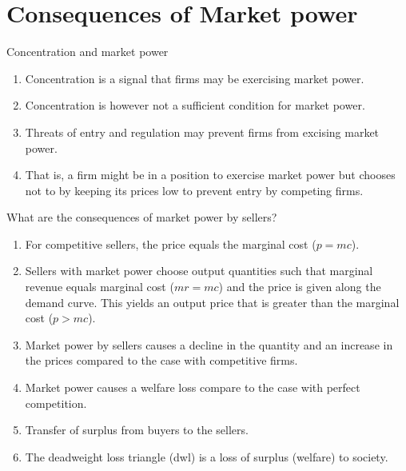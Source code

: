 \documentclass[table,xcolor=pdftex,dvipsnames]{beamer}\usepackage[]{graphicx}\usepackage[]{color}
\begin{document}

\section{Consequences of Market power}

\begin{frame}{Concentration and market power}
\begin{enumerate}[label=\textbullet]
  \item Concentration is a signal that firms may be exercising market power.
  \item Concentration is however not a sufficient condition for market power.
  \item Threats of entry and regulation may prevent firms from excising market power.
  \item That is, a firm might be in a position to exercise market power but chooses not to by keeping its prices low to prevent entry by competing firms.
\end{enumerate}
\end{frame}


\begin{frame}{What are the consequences of market power by sellers?}
\begin{enumerate}[label=\textbullet]
  \item For competitive sellers, the price equals the marginal cost ($p=mc$).
  \item Sellers with market power choose output quantities such that marginal revenue equals marginal cost ($mr=mc$) and the price is given along the demand curve. This yields an output price that is greater than the marginal cost ($p>mc$).
  \item Market power by sellers causes a decline in the quantity and an increase in the prices compared to the case with competitive firms.
  \item Market power causes a welfare loss compare to the case with perfect competition.
  \item Transfer of surplus from buyers to the sellers.
  \item The deadweight loss triangle (dwl) is a loss of surplus (welfare) to society.
\end{enumerate}
\end{frame}
\end{document}
